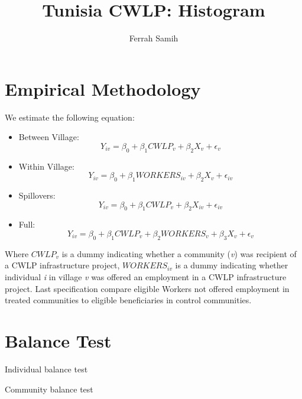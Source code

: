 \documentclass[10pt,a4paper]{article}
\begin{document}
\author{Ferrah Samih}\title{Tunisia CWLP: Histogram}\maketitle
\pagebreak
\tableofcontents
\pagebreak

\section{Empirical Methodology}
We estimate the following equation:
\begin{itemize}
\item Between Village: \begin{equation} Y_{iv} = \beta_{0} + \beta_{1}CWLP_{v} + \beta_{2}X_{v} + \epsilon_{v} \end{equation}
\item Within Village: \begin{equation} Y_{iv} = \beta_{0} + \beta_{1}WORKERS_{iv} + \beta_{2}X_{v} + \epsilon_{iv} \end{equation}
\item Spillovers: \begin{equation} Y_{iv} = \beta_{0} + \beta_{1}CWLP_{v} + \beta_{2}X_{iv} + \epsilon_{iv} \end{equation}
\item Full: \begin{equation} Y_{iv} = \beta_{0} + \beta_{1}CWLP_{v} + \beta_{2}WORKERS_{v} + \beta_{3}X_{v} + \epsilon_{v} \end{equation}
\end{itemize}
Where $ CWLP_{v} $ is a dummy indicating whether a community (\textit{v}) was recipient of a CWLP infrastructure project, $ WORKERS_{iv} $ is a dummy indicating whether individual \textit{i} in village \textit{v} was offered an employment in a CWLP infrastructure project. Last specification compare eligible Workers not offered employment in treated communities to eligible beneficiaries in control communities.
\pagebreak
\section{Balance Test}
\begin{table}[H]\centering\caption{Individual balance test}
\resizebox{\textwidth}{!}{}
\end{table}
\begin{table}[H]\centering\caption{Community balance test}
\scalebox{0.80}{}
\end{table}
\pagebreak
\end{document}
